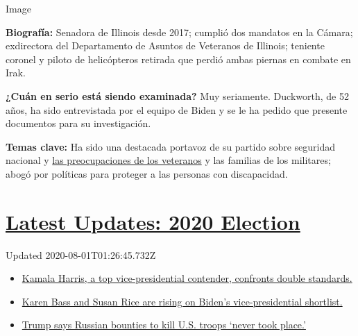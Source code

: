 Image

\textbf{Biografía:} Senadora de Illinois desde 2017; cumplió dos
mandatos en la Cámara; exdirectora del Departamento de Asuntos de
Veteranos de Illinois; teniente coronel y piloto de helicópteros
retirada que perdió ambas piernas en combate en Irak.

\textbf{¿Cuán en serio está siendo examinada?} Muy seriamente.
Duckworth, de 52 años, ha sido entrevistada por el equipo de Biden y se
le ha pedido que presente documentos para su investigación.

\textbf{Temas clave:} Ha sido una destacada portavoz de su partido sobre
seguridad nacional y
\href{https://www.nytimes.com/2018/03/26/us/army-veteran-deported.html}{las
preocupaciones de los veteranos} y las familias de los militares; abogó
por políticas para proteger a las personas con discapacidad.

\hypertarget{latest-updates-2020-election}{%
\section{\texorpdfstring{\href{https://www.nytimes.com/2020/07/31/us/elections/biden-vs-trump.html?action=click\&pgtype=Article\&state=default\&region=MAIN_CONTENT_1\&context=storylines_live_updates}{Latest
Updates: 2020
Election}}{Latest Updates: 2020 Election}}\label{latest-updates-2020-election}}

Updated 2020-08-01T01:26:45.732Z

\begin{itemize}
\tightlist
\item
  \href{https://www.nytimes.com/2020/07/31/us/elections/biden-vs-trump.html?action=click\&pgtype=Article\&state=default\&region=MAIN_CONTENT_1\&context=storylines_live_updates\#link-29fdff45}{Kamala
  Harris, a top vice-presidential contender, confronts double
  standards.}
\item
  \href{https://www.nytimes.com/2020/07/31/us/elections/biden-vs-trump.html?action=click\&pgtype=Article\&state=default\&region=MAIN_CONTENT_1\&context=storylines_live_updates\#link-13ec3d9c}{Karen
  Bass and Susan Rice are rising on Biden's vice-presidential
  shortlist.}
\item
  \href{https://www.nytimes.com/2020/07/31/us/elections/biden-vs-trump.html?action=click\&pgtype=Article\&state=default\&region=MAIN_CONTENT_1\&context=storylines_live_updates\#link-49e9a016}{Trump
  says Russian bounties to kill U.S. troops `never took place.'}
\end{itemize}

